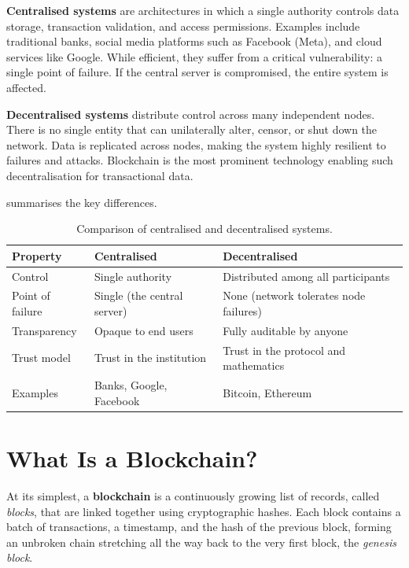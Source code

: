 \textbf{Centralised systems} are architectures in which a single authority controls data storage, transaction validation, and access permissions.  Examples include traditional banks, social media platforms such as Facebook (Meta), and cloud services like Google.  While efficient, they suffer from a critical vulnerability: a single point of failure.  If the central server is compromised, the entire system is affected.

\textbf{Decentralised systems} distribute control across many independent nodes. There is no single entity that can unilaterally alter, censor, or shut down the network.  Data is replicated across nodes, making the system highly resilient to failures and attacks.  Blockchain is the most prominent technology enabling such decentralisation for transactional data.

 summarises the key differences.

\begin{table}[htbp]
\centering
\renewcommand{\arraystretch}{1.3}
\begin{tabularx}{\textwidth}{l X X}
\toprule
\textbf{Property} & \textbf{Centralised} & \textbf{Decentralised} \\
\midrule
Control          & Single authority             & Distributed among all participants \\
Point of failure & Single (the central server)  & None (network tolerates node failures) \\
Transparency     & Opaque to end users          & Fully auditable by anyone \\
Trust model      & Trust in the institution     & Trust in the protocol and mathematics \\
Examples         & Banks, Google, Facebook      & Bitcoin, Ethereum \\
\bottomrule
\end{tabularx}
\caption{Comparison of centralised and decentralised systems.}
\label{tab:cent-vs-decent}
\end{table}

\section{What Is a Blockchain?}
\label{sec:what-is}

At its simplest, a \textbf{blockchain} is a continuously growing list of records, called \emph{blocks}, that are linked together using cryptographic hashes. Each block contains a batch of transactions, a timestamp, and the hash of the previous block, forming an unbroken chain stretching all the way back to the very first block, the \emph{genesis block}.

